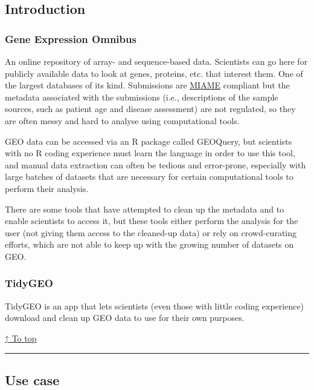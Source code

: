 \documentclass[]{article}
\begin{document}
\hypertarget{intro-to-tidygeo}{\subsection{Introduction}\label{intro-to-tidygeo}}

\hypertarget{intro-to-geo}{\subsubsection{Gene Expression
Omnibus}\label{intro-to-geo}}

An online repository of array- and sequence-based data. Scientists can
go here for publicly available data to look at genes, proteins, etc.
that interest them. One of the largest databases of its kind.
Submissions are
\href{https://www.ncbi.nlm.nih.gov/geo/info/MIAME.html}{MIAME} compliant
but the metadata associated with the submissions (i.e., descriptions of
the sample sources, such as patient age and disease assessment) are not
regulated, so they are often messy and hard to analyse using
computational tools.

GEO data can be accessed via an R package called GEOQuery, but
scientists with no R coding experience must learn the language in order
to use this tool, and manual data extraction can often be tedious and
error-prone, especially with large batches of datasets that are
necessary for certain computational tools to perform their analysis.

There are some tools that have attempted to clean up the metadata and to
enable scientists to access it, but these tools either perform the
analysis for the user (not giving them access to the cleaned-up data) or
rely on crowd-curating efforts, which are not able to keep up with the
growing number of datasets on GEO.

\hypertarget{app-motivation}{\subsubsection{TidyGEO}\label{app-motivation}}

TidyGEO is an app that lets scientists (even those with little coding
experience) download and clean up GEO data to use for their own
purposes.

\protect\hyperlink{contents}{↑ To top}

\begin{center}\rule{0.5\linewidth}{\linethickness}\end{center}

\hypertarget{use-case}{\subsection{Use case}\label{use-case}}
\end{document}
